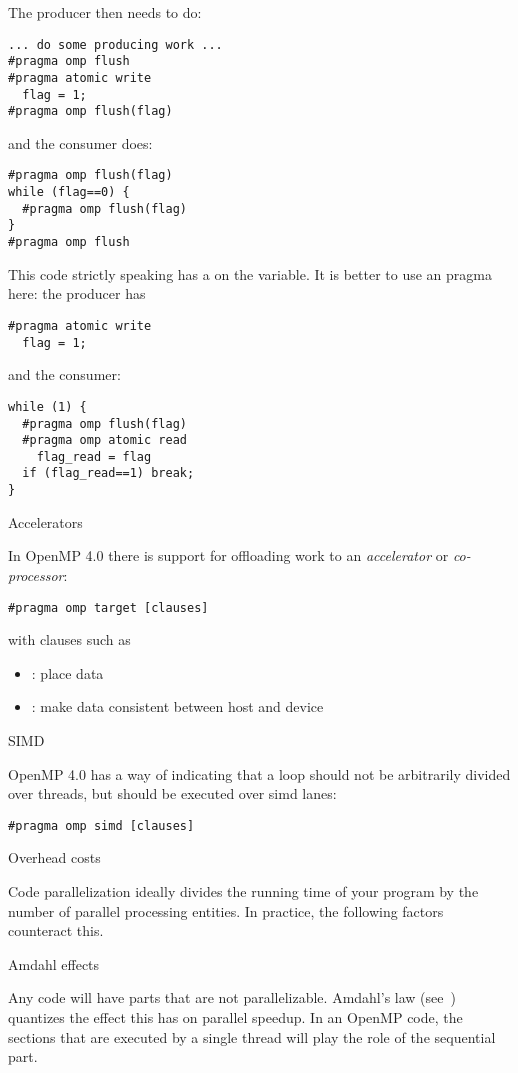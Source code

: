 The producer then needs to do:
\begin{verbatim}
... do some producing work ...
#pragma omp flush
#pragma atomic write
  flag = 1;
#pragma omp flush(flag)
\end{verbatim}
and the consumer does:
\begin{verbatim}
#pragma omp flush(flag)
while (flag==0) {
  #pragma omp flush(flag)
}
#pragma omp flush
\end{verbatim}
This code strictly speaking has a  on the  variable.
It is better to use an  pragma here: the producer has
\begin{verbatim}
#pragma atomic write
  flag = 1;
\end{verbatim}
and the consumer:
\begin{verbatim}
while (1) {
  #pragma omp flush(flag)
  #pragma omp atomic read
    flag_read = flag
  if (flag_read==1) break;
}
\end{verbatim}

 {Accelerators}

In OpenMP 4.0 there is support for offloading work to an
\emph{accelerator}
or
\emph{co-processor}:
\begin{verbatim}
#pragma omp target [clauses]
\end{verbatim}
with clauses such as
\begin{itemize}
\item {}: place data
\item {}: make data consistent between host and device
\end{itemize}

 {SIMD}

OpenMP 4.0 has a way of indicating that a loop should not
be arbitrarily divided over threads, but should be executed
over simd lanes:
\begin{verbatim}
#pragma omp simd [clauses]
\end{verbatim}

 {Overhead costs}

Code parallelization ideally divides the running time of your program
by the number of parallel processing entities. In practice, the following
factors counteract this.

 {Amdahl effects}

Any code will have parts that are not parallelizable. Amdahl's law
(see~) quantizes the effect this has on parallel speedup.
In an OpenMP code, the sections that are executed by a single thread
will play the role of the sequential part.

